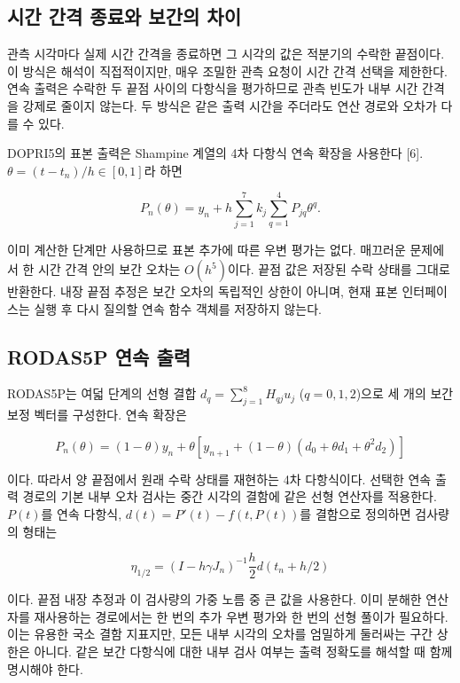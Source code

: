 \documentclass[
  10pt,
  dvipsnames]{article}
\begin{document}
\hypertarget{uxc2dcuxac04-uxac04uxaca9-uxc885uxb8ccuxc640-uxbcf4uxac04uxc758-uxcc28uxc774}{%
\subsection{시간 간격 종료와 보간의
차이}\label{uxc2dcuxac04-uxac04uxaca9-uxc885uxb8ccuxc640-uxbcf4uxac04uxc758-uxcc28uxc774}}

관측 시각마다 실제 시간 간격을 종료하면 그 시각의 값은 적분기의 수락한
끝점이다. 이 방식은 해석이 직접적이지만, 매우 조밀한 관측 요청이 시간
간격 선택을 제한한다. 연속 출력은 수락한 두 끝점 사이의 다항식을
평가하므로 관측 빈도가 내부 시간 간격을 강제로 줄이지 않는다. 두 방식은
같은 출력 시간을 주더라도 연산 경로와 오차가 다를 수 있다.

DOPRI5의 표본 출력은 Shampine 계열의 4차 다항식 연속 확장을 사용한다
{[}6{]}. \(\theta=(t-t_n)/h\in[0,1]\)라 하면

\[
 P_n(\theta)=y_n+h\sum_{j=1}^7 k_j
                \sum_{q=1}^{4}P_{jq}\theta^q.
 \tag{28}
\]

이미 계산한 단계만 사용하므로 표본 추가에 따른 우변 평가는 없다.
매끄러운 문제에서 한 시간 간격 안의 보간 오차는 \(O(h^5)\)이다. 끝점
값은 저장된 수락 상태를 그대로 반환한다. 내장 끝점 추정은 보간 오차의
독립적인 상한이 아니며, 현재 표본 인터페이스는 실행 후 다시 질의할 연속
함수 객체를 저장하지 않는다.

\hypertarget{rodas5p-uxc5f0uxc18d-uxcd9cuxb825}{%
\subsection{RODAS5P 연속 출력}\label{rodas5p-uxc5f0uxc18d-uxcd9cuxb825}}

RODAS5P는 여덟 단계의 선형 결합 \(d_q=\sum_{j=1}^8 H_{qj}u_j\)
(\(q=0,1,2\))으로 세 개의 보간 보정 벡터를 구성한다. 연속 확장은

\[
 P_n(\theta)=(1-\theta)y_n+\theta\left[y_{n+1}+(1-\theta)(d_0+\theta d_1+\theta^2d_2)\right]
\]

이다. 따라서 양 끝점에서 원래 수락 상태를 재현하는 4차 다항식이다.
선택한 연속 출력 경로의 기본 내부 오차 검사는 중간 시각의 결함에 같은
선형 연산자를 적용한다. \(P(t)\)를 연속 다항식,
\(d(t)=P'(t)-f(t,P(t))\)를 결함으로 정의하면 검사량의 형태는

\[
 \eta_{1/2}=(I-h\gamma J_n)^{-1}
                  \frac h2 d(t_n+h/2)
 \tag{29}
\]

이다. 끝점 내장 추정과 이 검사량의 가중 노름 중 큰 값을 사용한다. 이미
분해한 연산자를 재사용하는 경로에서는 한 번의 추가 우변 평가와 한 번의
선형 풀이가 필요하다. 이는 유용한 국소 결함 지표지만, 모든 내부 시각의
오차를 엄밀하게 둘러싸는 구간 상한은 아니다. 같은 보간 다항식에 대한
내부 검사 여부는 출력 정확도를 해석할 때 함께 명시해야 한다.
\end{document}
